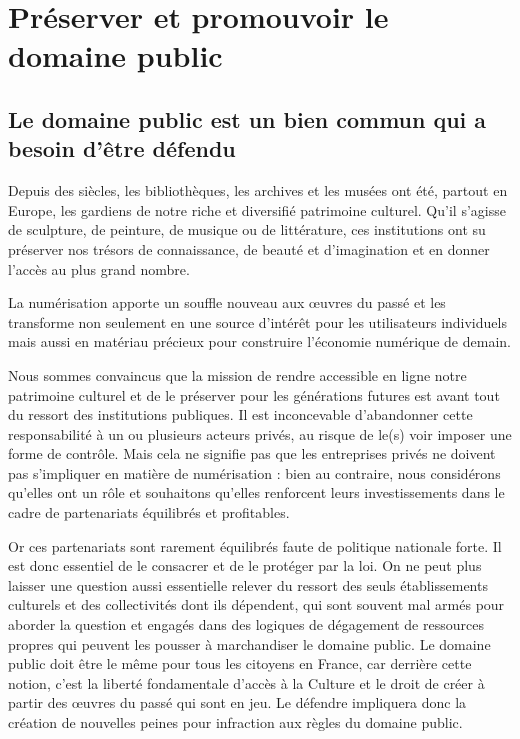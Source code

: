 \chapter{Préserver et promouvoir le domaine public}\label{dompub}

\section{Le domaine public est un bien commun qui a besoin d'être défendu}
Depuis des siècles, les bibliothèques, les archives et les musées ont été, partout en Europe, les
gardiens de notre riche et diversifié patrimoine culturel. Qu’il s’agisse de sculpture, de peinture,
de musique ou de littérature, ces institutions ont su préserver nos trésors de connaissance, de
beauté et d’imagination et en donner l’accès au plus grand nombre.

La numérisation apporte un souffle nouveau aux œuvres du passé et les transforme non
seulement en une source d’intérêt pour les utilisateurs individuels mais aussi en matériau précieux
pour construire l’économie numérique de demain.

Nous sommes convaincus que la mission de rendre accessible en ligne notre patrimoine culturel
et de le préserver pour les générations futures est avant tout du ressort des
institutions publiques. Il est inconcevable d’abandonner cette responsabilité à un ou plusieurs
acteurs privés, au risque de le(s) voir imposer une forme de contrôle. Mais cela ne signifie pas que
les entreprises privés ne doivent pas s’impliquer en matière de numérisation : bien au contraire,
nous considérons qu’elles ont un rôle et souhaitons qu’elles renforcent leurs investissements dans
le cadre de partenariats équilibrés et profitables.

Or ces partenariats sont rarement équilibrés faute de politique nationale forte. Il est donc essentiel de le consacrer et de le protéger par la loi. On ne peut plus laisser une question aussi essentielle relever du ressort des seuls établissements culturels et des collectivités dont ils dépendent, qui sont souvent mal armés pour aborder la question et engagés dans des logiques de dégagement de ressources propres qui peuvent les pousser à marchandiser le domaine public. Le domaine public doit être le même pour tous les citoyens en France, car derrière cette notion, c’est la liberté fondamentale d’accès à la Culture et le droit de créer à partir des œuvres du passé qui sont en jeu. Le défendre impliquera donc la création de nouvelles peines pour infraction aux règles du domaine public.


